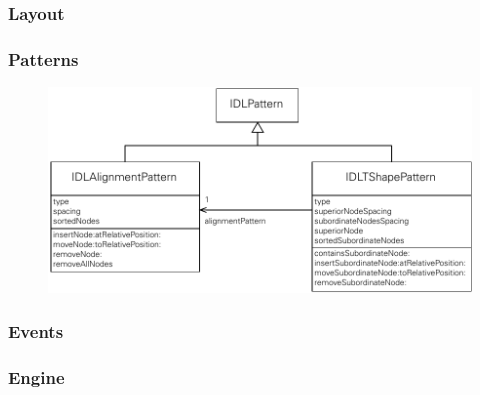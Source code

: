 

\subsubsection{Layout}

\subsubsection{Patterns}


\begin{figure}[hbt]
    \centering
    \includegraphics[width=\textwidth]{resources/layout-patterns-implementation}
    \caption{}
    \label{fig:layout-patterns-implementation}
\end{figure}

\subsubsection{Events}

\subsubsection{Engine}



